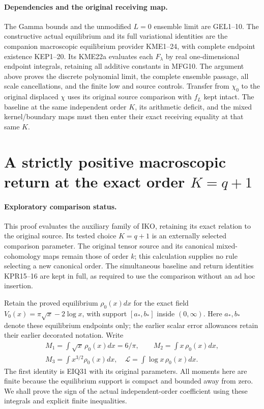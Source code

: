\documentclass[11pt,a4paper]{article}
\begin{document}
\paragraph{Dependencies and the original receiving map.}
The Gamma bounds and the unmodified $L=0$ ensemble limit are GEL1--10.
The constructive actual equilibrium and its full variational identities
are the companion macroscopic equilibrium provider KME1--24, with
complete endpoint existence KEP1--20. Its KME22a evaluates each
$F_\lambda$ by real one-dimensional endpoint integrals, retaining all
additive constants in MFG10. The argument above proves the discrete polynomial
limit, the complete ensemble passage, all scale cancellations, and the
finite low and source controls. Transfer from $\chi_0$ to the original
displaced $\chi$ uses its original source comparison with $f_L$ kept
intact. The baseline at the same independent order $K$, its arithmetic
deficit, and the mixed kernel/boundary maps must then enter their exact
receiving equality at that same $K$.



\clearpage

\section{A strictly positive macroscopic return at the exact order $K=q+1$}
\label{sec:KPR}

\paragraph{Exploratory comparison status.}
This proof evaluates the auxiliary family of IKO, retaining its exact
relation to the original source. Its tested choice $K=q+1$ is an
externally selected comparison parameter. The original tensor source
and its canonical mixed-cohomology maps remain those of order $k$;
this calculation supplies no rule selecting a new canonical order.
The simultaneous baseline and return identities KPR15--16 are kept
in full, as required to use the comparison without an ad hoc insertion.

Retain the proved equilibrium $\rho_0(x)dx$ for the exact field
$V_0(x)=\pi\sqrt x-2\log x$, with support $[a_*,b_*]$ inside
$(0,\infty)$. Here $a_*,b_*$ denote these equilibrium endpoints
only; the earlier scalar error allowances retain their earlier
decorated notation. Write
\[
 \begin{gathered}
 M_1=\int\sqrt x\,\rho_0(x)dx=6/\pi,\qquad
 M_2=\int x\,\rho_0(x)dx,\\
 M_3=\int x^{3/2}\rho_0(x)dx,
 \quad\mathcal L=\int\log x\,\rho_0(x)dx.
 \end{gathered}
 \tag{KPR1}
\]
The first identity is EIQ31 with its original parameters. All moments
here are finite because the equilibrium support is compact and bounded
away from zero. We shall prove the sign of the actual independent-order
coefficient using these integrals and explicit finite inequalities.
\end{document}
